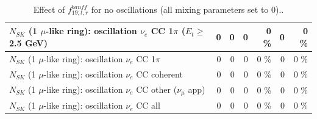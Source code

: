 \begin{table}
\begin{tabular}{| l | r | r | r  r | r  r |}
$N_{SK}$ (1 $\mu$-like ring): oscillation $\nu_e$ CC 1$\pi$ ($E_{t} \geq$ 2.5 GeV) &               0 &               0 &               0 &        0 \%  &               0 &        0 \%  \\ 
\hline
                     $N_{SK}$ (1 $\mu$-like ring): oscillation $\nu_e$ CC 1$\pi$ &               0 &               0 &               0 &        0 \%  &               0 &        0 \%  \\ 
                   $N_{SK}$ (1 $\mu$-like ring): oscillation $\nu_e$ CC coherent &               0 &               0 &               0 &        0 \%  &               0 &        0 \%  \\ 
      $N_{SK}$ (1 $\mu$-like ring): oscillation $\nu_e$ CC other ($\nu_\mu$ app) &               0 &               0 &               0 &        0 \%  &               0 &        0 \%  \\ 
                       $N_{SK}$ (1 $\mu$-like ring): oscillation $\nu_e$  CC all &               0 &               0 &               0 &        0 \%  &               0 &        0 \%  \\ 
\hline
\hline
\end{tabular}
\caption{ Effect of $f_{19; t, r}^{banff}$ for no oscillations (all mixing parameters set to 0).. }
\label{tab:num_banff_ccqeE1_1RmuT_3f_osc_t13:0}
\end{table}
\clearpage
